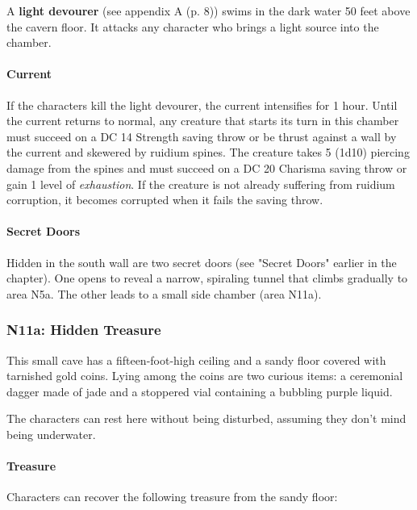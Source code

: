 \documentclass[a4paper, 11pt, bg=full, twocolumn, nooutline]{dndbook}
\begin{document}
A \textbf{light devourer} (see appendix A (p. 8)) swims in the dark water 50 feet above the cavern floor. It attacks any character who brings a light source into the chamber.

\paragraph{Current}

If the characters kill the light devourer, the current intensifies for 1 hour. Until the current returns to normal, any creature that starts its turn in this chamber must succeed on a DC 14 Strength saving throw or be thrust against a wall by the current and skewered by ruidium spines. The creature takes 5 (1d10) piercing damage from the spines and must succeed on a DC 20 Charisma saving throw or gain 1 level of \textit{exhaustion}. If the creature is not already suffering from ruidium corruption, it becomes corrupted when it fails the saving throw.

\paragraph{Secret Doors}

Hidden in the south wall are two secret doors (see "Secret Doors" earlier in the chapter). One opens to reveal a narrow, spiraling tunnel that climbs gradually to area N5a. The other leads to a small side chamber (area N11a).

\subsubsection{N11a: Hidden Treasure}

\begin{DndReadAloud}
This small cave has a fifteen-foot-high ceiling and a sandy floor covered with tarnished gold coins. Lying among the coins are two curious items: a ceremonial dagger made of jade and a stoppered vial containing a bubbling purple liquid.
\end{DndReadAloud}

The characters can rest here without being disturbed, assuming they don't mind being underwater.

\paragraph{Treasure}

Characters can recover the following treasure from the sandy floor:
\end{document}
